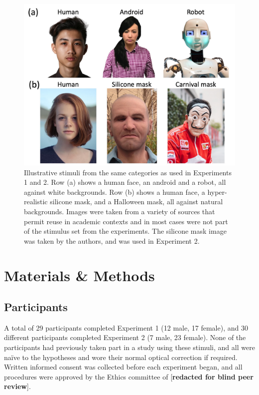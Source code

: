 \documentclass[
]{article}
\begin{document}
\begin{figure}

{\centering \includegraphics[width=0.8\linewidth]{Figures/stimfigure} 

}

\caption{Illustrative stimuli from the same categories as used in Experiments 1 and 2. Row (a) shows a human face, an android and a robot, all against white backgrounds. Row (b) shows a human face, a hyper-realistic silicone mask, and a Halloween mask, all against natural backgrounds. Images were taken from a variety of sources that permit reuse in academic contexts and in most cases were not part of the stimulus set from the experiments. The silicone mask image was taken by the authors, and was used in Experiment 2.}\label{fig:stimexamples}
\end{figure}

\section{Materials \& Methods}\label{materials-methods}

\subsection{Participants}\label{participants}

A total of 29 participants completed Experiment 1 (12 male, 17 female), and 30 different participants completed Experiment 2 (7 male, 23 female). None of the participants had previously taken part in a study using these stimuli, and all were naïve to the hypotheses and wore their normal optical correction if required. Written informed consent was collected before each experiment began, and all procedures were approved by the Ethics committee of {[}\textbf{redacted for blind peer review}{]}.
\end{document}
